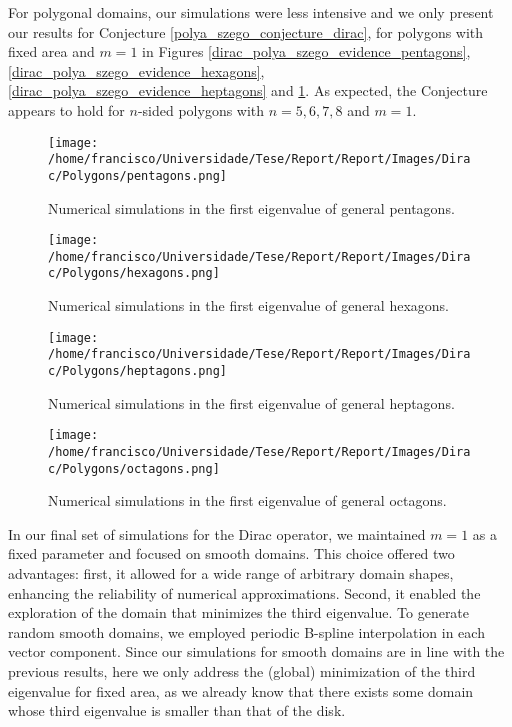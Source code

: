 \documentclass[5p,authoryear]{elsarticle}
\begin{document}
For polygonal domains, our simulations were less intensive and we only present our results for Conjecture \ref{polya_szego_conjecture_dirac}, for polygons with fixed area and \(m=1\) in Figures \ref{dirac_polya_szego_evidence_pentagons}, \ref{dirac_polya_szego_evidence_hexagons}, \ref{dirac_polya_szego_evidence_heptagons} and \ref{dirac_polya_szego_evidence_octagons}. As expected, the Conjecture appears to hold for \(n\)-sided polygons with \(n=5,6,7,8\) and \(m=1\).
\begin{figure}
    \centering
    \begin{minipage}[b]{0.2\textwidth}
        \centering
        \texttt{[image: /home/francisco/Universidade/Tese/Report/Report/Images/Dirac/Polygons/pentagons.png]}
    \caption{Numerical simulations in the first eigenvalue of general pentagons.}
    \label{dirac_polya_szego_evidence_pentagons}
    \end{minipage}
    \hfill
    \begin{minipage}[b]{0.2\textwidth}
        \centering
        \texttt{[image: /home/francisco/Universidade/Tese/Report/Report/Images/Dirac/Polygons/hexagons.png]}
    \caption{Numerical simulations in the first eigenvalue of general hexagons.}
    \label{dirac_polya_szego_evidence_hexagons}
    \end{minipage}

    \vspace{0.5cm}

    \begin{minipage}[b]{0.2\textwidth}
        \centering
        \texttt{[image: /home/francisco/Universidade/Tese/Report/Report/Images/Dirac/Polygons/heptagons.png]}
    \caption{Numerical simulations in the first eigenvalue of general heptagons.}
    \label{dirac_polya_szego_evidence_heptagons}
    \end{minipage}
    \hfill
    \begin{minipage}[b]{0.2\textwidth}
        \centering
        \texttt{[image: /home/francisco/Universidade/Tese/Report/Report/Images/Dirac/Polygons/octagons.png]}
    \caption{Numerical simulations in the first eigenvalue of general octagons.}
    \label{dirac_polya_szego_evidence_octagons}
    \end{minipage}
\end{figure}
In our final set of simulations for the Dirac operator, we maintained $m=1$ as a fixed parameter and focused on smooth domains. This choice offered two advantages: first, it allowed for a wide range of arbitrary domain shapes, enhancing the reliability of numerical approximations. Second, it enabled the exploration of the domain that minimizes the third eigenvalue. To generate random smooth domains, we employed periodic B-spline interpolation \cite{de1978practical} in each vector component. Since our simulations for smooth domains are in line with the previous results, here we only address the (global) minimization of the third eigenvalue for fixed area, as we already know that there exists some domain whose third eigenvalue is smaller than that of the disk.
\end{document}
